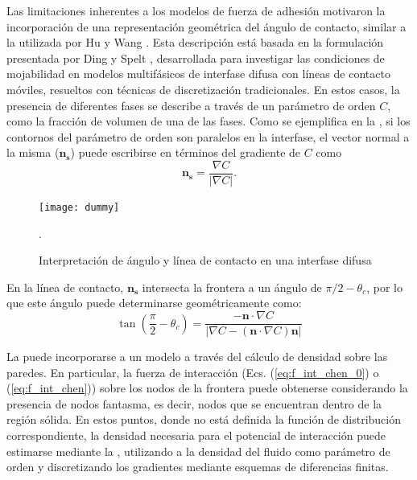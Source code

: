 Las limitaciones inherentes a los modelos de fuerza de adhesi\'on motivaron la incorporaci\'on de una representaci\'on geom\'etrica del \'angulo de contacto, similar a la utilizada por Hu \cite{hu_contact_2016} y Wang \cite{wang_scheme_2013}. Esta descripci\'on est\'a basada en la formulaci\'on presentada por Ding y Spelt \cite{ding_wetting_2007}, desarrollada para investigar las condiciones de mojabilidad en modelos multif\'asicos de interfase difusa con l\'ineas de contacto m\'oviles, resueltos con t\'ecnicas de discretizaci\'on tradicionales. En estos casos, la presencia de diferentes fases se describe a trav\'es de un par\'ametro de orden $C$, como la fracci\'on de volumen de una de las fases. Como se ejemplifica en la , si los contornos del par\'ametro de orden son paralelos en la interfase, el vector normal a la misma ($\bm{n_s}$) puede escribirse en t\'erminos del gradiente de $C$ como
\begin{equation}
	\bm{n_s} = \dfrac{\nabla C}{|\nabla C|}.
\end{equation}

\begin{figure}[ht]
	\centering
	\texttt{[image: dummy]}
	\caption{Interpretaci\'on de \'angulo y l\'inea de contacto en una interfase difusa}.
	\label{fig:ding_contacto}
\end{figure}

En la l\'inea de contacto, $\bm{n_s}$ intersecta la frontera a un \'angulo de $\pi/2 - \theta_c$, por lo que este \'angulo puede determinarse geom\'etricamente como:
\begin{equation}
	\tan \left( \dfrac{\pi}{2} - \theta_c \right) = \dfrac{-\bm{n} \cdot \nabla C}{|\nabla C - (\bm{n}\cdot \nabla C)\bm{n}|}
	\label{eq:ding_angulo}
\end{equation}

La  puede incorporarse a un modelo \pp{} a trav\'es del c\'alculo de densidad sobre las paredes. En particular, la fuerza de interacci\'on (Ecs. (\ref{eq:f_int_chen_0}) o (\ref{eq:f_int_chen})) sobre los nodos de la frontera puede obtenerse considerando la presencia de nodos fantasma, es decir, nodos que se encuentran dentro de la regi\'on s\'olida. En estos puntos, donde no est\'a definida la funci\'on de distribuci\'on correspondiente, la densidad necesaria para el potencial de interacci\'on puede estimarse mediante la , utilizando a la densidad del fluido como par\'ametro de orden y discretizando los gradientes mediante esquemas de diferencias finitas. 


